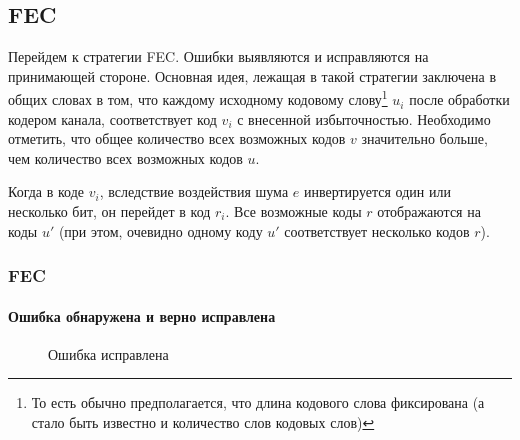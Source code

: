 \subsection{FEC}


Перейдем к стратегии FEC. Ошибки выявляются и исправляются на принимающей стороне. Основная идея, лежащая в такой стратегии заключена в общих словах в том, что каждому исходному кодовому слову\footnote{То есть обычно предполагается, что длина кодового слова фиксирована (а стало быть известно и количество слов кодовых слов)} $u_i$ после обработки кодером канала, соответствует код $v_i$ с внесенной избыточностью. Необходимо отметить, что общее количество всех возможных кодов $v$ значительно больше, чем количество всех возможных кодов $u$. 

Когда в коде $v_i$, вследствие воздействия шума $e$ инвертируется один или несколько бит, он перейдет в код $r_i$. Все возможные коды $r$ отображаются на коды $u'$ (при этом, очевидно одному коду $u'$ соответствует несколько кодов $r$). 


\begin{frame}
    \frametitle{FEC}
    \framesubtitle{Ошибка обнаружена и верно исправлена}
    
    \begin{figure}
        \begin{center}
            \caption{Ошибка исправлена}\label{pict:fecOk}
        \end{center}
    \end{figure} 
\end{frame}


